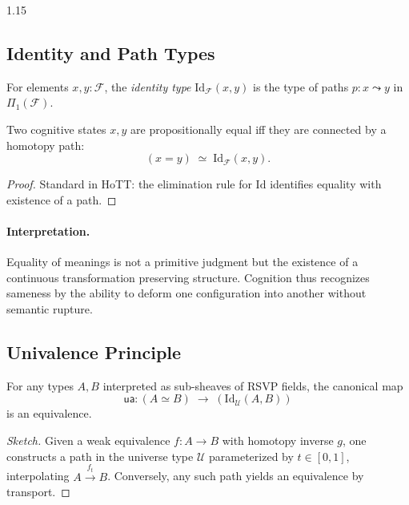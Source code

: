 \documentclass[12pt,a4paper]{article}
\begin{document}
\begin{spacing}{1.15}
\subsection{Identity and Path Types}

\begin{definition}
\label{def:idtype}
For elements \(x,y:\mathscr{F}\),
the \emph{identity type} \(\mathrm{Id}_{\mathscr{F}}(x,y)\)
is the type of paths \(p:x\leadsto y\) in \(\Pi_1(\mathscr{F})\).
\end{definition}

\begin{proposition}
\label{prop:path}
Two cognitive states \(x,y\) are propositionally equal
iff they are connected by a homotopy path:
\[
  (x = y) \;\simeq\; \mathrm{Id}_{\mathscr{F}}(x,y).
\]
\end{proposition}

\begin{proof}
Standard in HoTT: the elimination rule for \(\mathrm{Id}\)
identifies equality with existence of a path.
\end{proof}

\paragraph{Interpretation.}
Equality of meanings is not a primitive judgment
but the existence of a continuous transformation
preserving structure.
Cognition thus recognizes sameness
by the ability to deform one configuration into another
without semantic rupture.

\subsection{Univalence Principle}

\begin{theorem}
\label{thm:univalence}
For any types \(A,B\) interpreted as sub-sheaves of RSVP fields,
the canonical map
\[
  \mathsf{ua}: (A \simeq B) \;\longrightarrow\;
               (\mathrm{Id}_{\mathcal{U}}(A,B))
\]
is an equivalence.
\end{theorem}

\begin{proof}[Sketch]
Given a weak equivalence \(f:A\!\to\!B\)
with homotopy inverse \(g\),
one constructs a path in the universe type \(\mathcal{U}\)
parameterized by \(t\!\in\![0,1]\),
interpolating \(A\!\xrightarrow{f_t}\!B\).
Conversely, any such path yields an equivalence by transport.
\end{proof}


\end{spacing}
\end{document}
